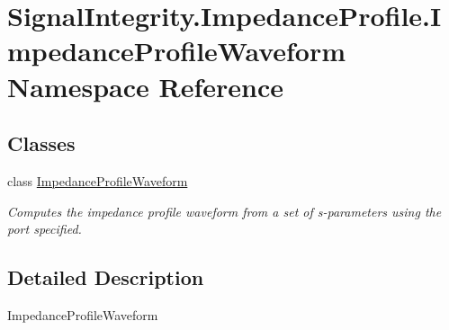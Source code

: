 \hypertarget{namespaceSignalIntegrity_1_1ImpedanceProfile_1_1ImpedanceProfileWaveform}{}\section{Signal\+Integrity.\+Impedance\+Profile.\+Impedance\+Profile\+Waveform Namespace Reference}
\label{namespaceSignalIntegrity_1_1ImpedanceProfile_1_1ImpedanceProfileWaveform}
\subsection*{Classes}
\begin{DoxyCompactItemize}
\item 
class \hyperlink{classSignalIntegrity_1_1ImpedanceProfile_1_1ImpedanceProfileWaveform_1_1ImpedanceProfileWaveform}{Impedance\+Profile\+Waveform}
\begin{DoxyCompactList}\small\item\em Computes the impedance profile waveform from a set of s-\/parameters using the port specified. \end{DoxyCompactList}\end{DoxyCompactItemize}


\subsection{Detailed Description}
\begin{DoxyVerb}ImpedanceProfileWaveform\end{DoxyVerb}
 